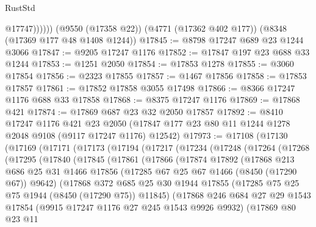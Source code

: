 \begin{lexlean}{RustStd}
\begin{coremodule}
                @17747))))))
    (@9550 (@17358 @22))
    (@4771 (@17362 @402 @177))
    (@8348 (@17369 @177 @48 @1408 @1244))
@17845 := @8798 @17247 @689 @23 @1244 @3066
@17847 := @9205 @17247 @1176
@17852 := @17847 @197 @23 @688 @33 @1244
@17853 := @1251 @2050
@17854 := @17853 @1278
@17855 := @3060 @17854
@17856 := @2323 @17855
@17857 := @1467 @17856
@17858 := @17853 @17857
@17861 := @17852 @17858 @3055 @17498
@17866 := @8366 @17247 @1176 @688 @33 @17858
@17868 := @8375 @17247 @1176
@17869 := @17868 @421
@17874 := @17869 @687 @23 @32 @2050 @17857
@17892 := @8410
    @17247
    @1176
    @421
    @23
    @2050
    (@17847 @177 @23 @80 @11 @1244 @1278 @2048 @9108 (@9117 @17247 @1176) @12542)
@17973 := @17108
    (@17130
      (@17169
        (@17171
          (@17173
            (@17194
              (@17217
                (@17234
                  (@17248
                    (@17264
                      (@17268
                        (@17295
                          (@17840
                            (@17845
                              (@17861
                                (@17866
                                  (@17874
                                    @17892
                                    (@17868
                                      @213
                                      @686
                                      @25
                                      @31
                                      @1466
                                      @17856
                                      (@17285 @67 @25 @67 @1466 (@8450 (@17290 @67)) @9642)
                                      (@17868
                                        @372
                                        @685
                                        @25
                                        @30
                                        @1944
                                        @17855
                                        (@17285 @75 @25 @75 @1944 (@8450 (@17290 @75)) @11845)
                                        (@17868
                                          @246
                                          @684
                                          @27
                                          @29
                                          @1543
                                          @17854
                                          (@9915 @17247 @1176 @27 @245 @1543 @9926 @9932)
                                          (@17869
                                            @80
                                            @23
                                            @11

\end{coremodule}
\end{lexlean}

